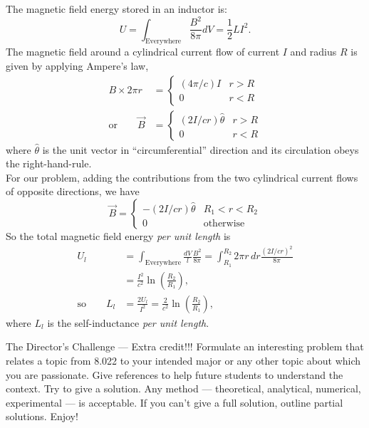 \documentclass[makesolutionspdf]{esg8022pset}
\begin{document}
\begin{solution}
  The magnetic field energy stored in an inductor is:
  \begin{equation}
    U=\int_{\text{Everywhere}} \frac{B^2}{8\pi} dV = \frac{1}{2}LI^2.
  \end{equation}
  The magnetic field around a cylindrical current flow of current
  $I$ and radius $R$ is given by applying Ampere's law,
  \begin{align*}
    B\times 2\pi r & = \begin{cases}
                        (4\pi/c)I & r>R \\
                        0 & r<R
                       \end{cases} \\
    \text{or}\qquad \vec{B} & = \begin{cases}
                                  (2I/cr) \hat{\theta} & r>R \\
                                  0 & r<R
                                \end{cases}
  \end{align*}
  where $\hat{\theta}$ is the unit vector in ``circumferential''
  direction and its circulation obeys the right-hand-rule.\\

  For our problem, adding the contributions from the two cylindrical
  current flows of opposite directions, we have
  \begin{equation}
    \vec{B} = 
      \begin{cases}
        -(2I/cr) \hat{\theta} & R_1<r<R_2 \\ 
        0 & \text{otherwise}
      \end{cases}
  \end{equation}
  So the total magnetic field energy \emph{per unit length} is
  \begin{align*}
    U_{l} & = \int_{\text{Everywhere}} \frac{dV}{l} \frac{B^2}{8\pi} 
      = \int_{R_1}^{R_2} 2\pi r\,dr \frac{(2I/cr)^2}{8\pi} \\
      & = \frac{I^2}{c^2}\ln\left(\frac{R_2}{R_1}\right),\\
    \text{so}\qquad L_{l} & = \frac{2U_{l}}{I^2}=\frac{2}{c^2}\ln{(\frac{R_2}{R_1})},
  \end{align*}
  where $L_{l}$ is the self-inductance \emph{per unit length}.
\end{solution}

\begin{problem}{The Director's Challenge --- Extra credit!!!}
  Formulate an interesting problem that relates a topic from 8.022 to your
  intended major or any other topic about which you are passionate.  Give
  references to help future students to understand the context.  Try to give a
  solution.  Any method --- theoretical, analytical, numerical, experimental
  --- is acceptable.  If you can't give a full solution, outline partial
  solutions. Enjoy!
\end{problem}
\end{document}
